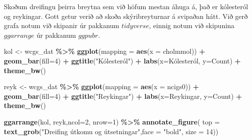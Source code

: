 \documentclass[
]{book}
\newenvironment{Shaded}{\begin{snugshade}}{\end{snugshade}}
\newcommand{\DataTypeTok}[1]{\textcolor[rgb]{0.13,0.29,0.53}{#1}}
\newcommand{\DecValTok}[1]{\textcolor[rgb]{0.00,0.00,0.81}{#1}}
\newcommand{\KeywordTok}[1]{\textcolor[rgb]{0.13,0.29,0.53}{\textbf{#1}}}
\newcommand{\NormalTok}[1]{#1}
\newcommand{\OperatorTok}[1]{\textcolor[rgb]{0.81,0.36,0.00}{\textbf{#1}}}
\newcommand{\StringTok}[1]{\textcolor[rgb]{0.31,0.60,0.02}{#1}}
\begin{document}
Skoðum dreifingu þeirra breytna sem við höfum mestan áhuga á, það er kólesteról og reykingar. Gott getur verið að skoða skýribreyturnar á svipaðan hátt. Við gerð grafa notum við skipanir úr pakkanum \(tidyverse\), einnig notum við skipunina \(ggarrange\) úr pakkanum \(ggpubr\).

\begin{Shaded}
\begin{Highlighting}[]
\NormalTok{kol <{-}}\StringTok{ }\NormalTok{wcgs\_dat }\OperatorTok{\%>\%}\StringTok{ }
\StringTok{  }\KeywordTok{ggplot}\NormalTok{(}\DataTypeTok{mapping =} \KeywordTok{aes}\NormalTok{(}\DataTypeTok{x =}\NormalTok{ cholmmol)) }\OperatorTok{+}\StringTok{ }
\StringTok{  }\KeywordTok{geom\_bar}\NormalTok{(}\DataTypeTok{fill=}\DecValTok{4}\NormalTok{) }\OperatorTok{+}
\StringTok{  }\KeywordTok{ggtitle}\NormalTok{(}\StringTok{"Kólesteról"}\NormalTok{) }\OperatorTok{+}
\StringTok{  }\KeywordTok{labs}\NormalTok{(}\DataTypeTok{x=}\StringTok{\textquotesingle{}Kólesteról\textquotesingle{}}\NormalTok{, }\DataTypeTok{y=}\StringTok{\textquotesingle{}Count\textquotesingle{}}\NormalTok{) }\OperatorTok{+}
\StringTok{  }\KeywordTok{theme\_bw}\NormalTok{()}

\NormalTok{reyk <{-}}\StringTok{ }\NormalTok{wcgs\_dat }\OperatorTok{\%>\%}\StringTok{ }
\StringTok{  }\KeywordTok{ggplot}\NormalTok{(}\DataTypeTok{mapping =} \KeywordTok{aes}\NormalTok{(}\DataTypeTok{x =}\NormalTok{ ncigs0)) }\OperatorTok{+}\StringTok{ }
\StringTok{  }\KeywordTok{geom\_bar}\NormalTok{(}\DataTypeTok{fill=}\DecValTok{4}\NormalTok{) }\OperatorTok{+}
\StringTok{  }\KeywordTok{ggtitle}\NormalTok{(}\StringTok{"Reykingar"}\NormalTok{) }\OperatorTok{+}
\StringTok{  }\KeywordTok{labs}\NormalTok{(}\DataTypeTok{x=}\StringTok{\textquotesingle{}Reykingar\textquotesingle{}}\NormalTok{, }\DataTypeTok{y=}\StringTok{\textquotesingle{}Count\textquotesingle{}}\NormalTok{) }\OperatorTok{+}\StringTok{  }
\StringTok{  }\KeywordTok{theme\_bw}\NormalTok{()}

\KeywordTok{ggarrange}\NormalTok{(kol, reyk,}\DataTypeTok{ncol=}\DecValTok{2}\NormalTok{, }\DataTypeTok{nrow=}\DecValTok{1}\NormalTok{) }\OperatorTok{\%>\%}\StringTok{ }
\StringTok{  }\KeywordTok{annotate\_figure}\NormalTok{(}
    \DataTypeTok{top =} \KeywordTok{text\_grob}\NormalTok{(}\StringTok{"Dreifing útkomu og útsetningar"}\NormalTok{,}\DataTypeTok{face =} \StringTok{"bold"}\NormalTok{, }\DataTypeTok{size =} \DecValTok{14}\NormalTok{))}
\end{Highlighting}
\end{Shaded}
\end{document}
